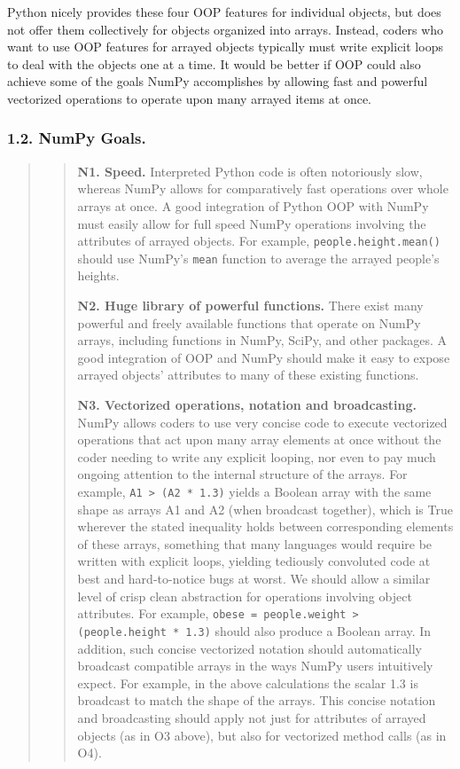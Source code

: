 \documentclass[letterpaper,compsoc,twoside]{IEEEtran}
\begin{document}
Python nicely provides these four OOP features for individual objects, but does not offer them collectively for objects organized into arrays.  Instead, coders who want to use OOP features for arrayed objects typically must write explicit loops to deal with the objects one at a time.  It would be better if OOP could also achieve some of the goals NumPy accomplishes by allowing fast and powerful \textquotedbl{}vectorized\textquotedbl{} operations to operate upon many arrayed items at once.

\subsubsection{1.2.  NumPy Goals.%
  \label{numpy-goals}%
}
\begin{quotation}%
\begin{quote}


\textbf{N1.  Speed.}  Interpreted Python code is often notoriously slow, whereas NumPy allows for comparatively fast operations over whole arrays at once.  A good integration of Python OOP with NumPy must easily allow for full speed NumPy operations involving the attributes of arrayed objects.  For example, \texttt{people.height.mean()} should use NumPy's \texttt{mean} function to average the arrayed people's heights.

\textbf{N2.  Huge library of powerful functions.}  There exist many powerful and freely available functions that operate on NumPy arrays, including functions in NumPy, SciPy, and other packages.  A good integration of OOP and NumPy should make it easy to expose arrayed objects' attributes to many of these existing functions.

\textbf{N3.  Vectorized operations, notation and broadcasting.}  NumPy allows coders to use very concise code to execute vectorized operations that act upon many array elements at once without the coder needing to write any explicit looping, nor even to pay much ongoing attention to the internal structure of the arrays.  For example, \texttt{A1 > (A2 * 1.3)} yields a Boolean array with the same shape as arrays A1 and A2 (when broadcast together), which is True wherever the stated inequality holds between corresponding elements of these arrays, something that many languages would require be written with explicit loops, yielding tediously convoluted code at best and hard-to-notice bugs at worst.  We should allow a similar level of crisp clean abstraction for operations involving object attributes.  For example, \texttt{obese = people.weight > (people.height * 1.3)} should also produce a Boolean array.  In addition, such concise vectorized notation should automatically broadcast compatible arrays in the ways NumPy users intuitively expect.  For example, in the above calculations the scalar 1.3 is broadcast to match the shape of the arrays.  This concise notation and broadcasting should apply not just for attributes of arrayed objects (as in O3 above), but also for vectorized method calls (as in O4).


\end{quote}
\end{quotation}
\end{document}
